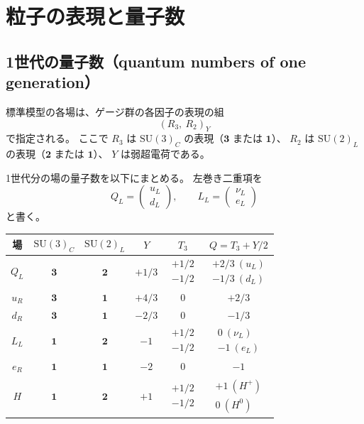 \documentclass[uplatex,dvipdfmx,a4paper,11pt,openany]{jsbook}
\numberwithin{equation}{chapter}
\theoremstyle{definition}
\theoremstyle{plain}
\theoremstyle{remark}
\newcommand{\SU}{\mathrm{SU}}
\begin{document}
\section{粒子の表現と量子数}
\subsection{1世代の量子数（quantum numbers of one generation）}
標準模型の各場は、ゲージ群の各因子の表現の組
\begin{equation}
(R_3,\ R_2)_Y
\end{equation}
で指定される。
ここで $R_3$ は $\SU(3)_C$ の表現（$\mathbf{3}$ または $\mathbf{1}$）、
$R_2$ は $\SU(2)_L$ の表現（$\mathbf{2}$ または $\mathbf{1}$）、
$Y$ は弱超電荷である。

1世代分の場の量子数を以下にまとめる。
左巻き二重項を
\begin{equation}
Q_L=\begin{pmatrix}u_L\\ d_L\end{pmatrix},
\qquad
L_L=\begin{pmatrix}\nu_L\\ e_L\end{pmatrix}
\end{equation}
と書く。
\begin{center}
\renewcommand{\arraystretch}{1.35}
\begin{tabular}{cccccc}
\toprule
場 & $\SU(3)_C$ & $\SU(2)_L$ & $Y$ & $T_3$ & $Q=T_3+Y/2$\\
\midrule
$Q_L$ & $\mathbf{3}$ & $\mathbf{2}$ & $+1/3$ &
$\begin{matrix}+1/2\\ -1/2\end{matrix}$ &
$\begin{matrix}+2/3\ (u_L)\\ -1/3\ (d_L)\end{matrix}$\\
$u_R$ & $\mathbf{3}$ & $\mathbf{1}$ & $+4/3$ & $0$ & $+2/3$\\
$d_R$ & $\mathbf{3}$ & $\mathbf{1}$ & $-2/3$ & $0$ & $-1/3$\\
\midrule
$L_L$ & $\mathbf{1}$ & $\mathbf{2}$ & $-1$ &
$\begin{matrix}+1/2\\ -1/2\end{matrix}$ &
$\begin{matrix}0\ (\nu_L)\\ -1\ (e_L)\end{matrix}$\\
$e_R$ & $\mathbf{1}$ & $\mathbf{1}$ & $-2$ & $0$ & $-1$\\
\midrule
$H$ & $\mathbf{1}$ & $\mathbf{2}$ & $+1$ &
$\begin{matrix}+1/2\\ -1/2\end{matrix}$ &
$\begin{matrix}+1\ (H^+)\\ 0\ (H^0)\end{matrix}$\\
\bottomrule
\end{tabular}
\end{center}
\end{document}
